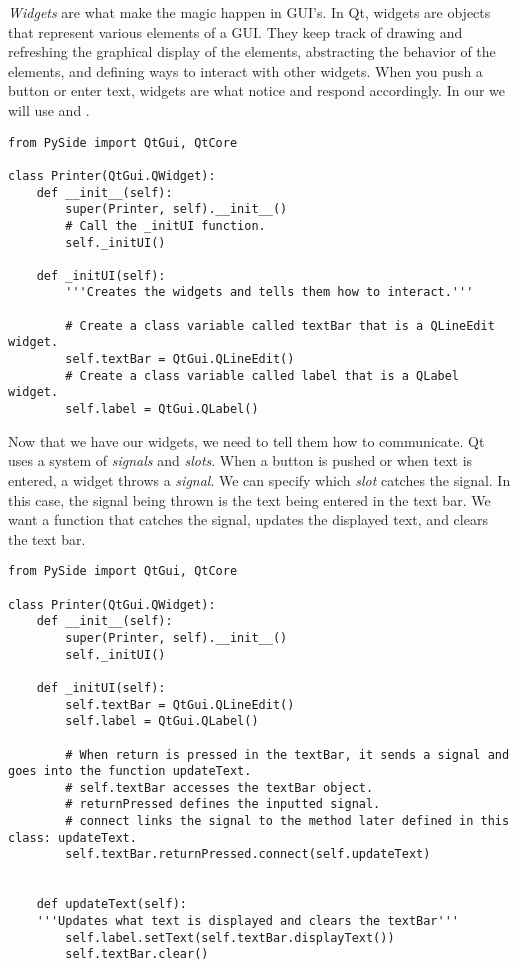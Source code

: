 \emph{Widgets} are what make the magic happen in GUI's.
In Qt, widgets are objects that represent various elements of a GUI.
They keep track of drawing and refreshing the graphical display of the elements, abstracting the behavior of the elements, and defining ways to interact with other widgets.
When you push a button or enter text, widgets are what notice and respond accordingly.
In our  we will use  and .

\begin{lstlisting}
from PySide import QtGui, QtCore

class Printer(QtGui.QWidget):
	def __init__(self):
		super(Printer, self).__init__()
		# Call the _initUI function.
		self._initUI()

	def _initUI(self):
		'''Creates the widgets and tells them how to interact.'''

		# Create a class variable called textBar that is a QLineEdit widget.
		self.textBar = QtGui.QLineEdit()
		# Create a class variable called label that is a QLabel widget.
		self.label = QtGui.QLabel()

\end{lstlisting}

Now that we have our widgets, we need to tell them how to communicate.
Qt uses a system of \emph{signals} and \emph{slots}.
When a button is pushed or when text is entered, a widget throws a \emph{signal}.
We can specify which \emph{slot} catches the signal.
In this case, the signal being thrown is the text being entered in the text bar. We want a function that catches the signal, updates the displayed text, and clears the text bar.

\begin{lstlisting}
from PySide import QtGui, QtCore

class Printer(QtGui.QWidget):
	def __init__(self):
		super(Printer, self).__init__()
		self._initUI()

	def _initUI(self):
		self.textBar = QtGui.QLineEdit()
		self.label = QtGui.QLabel()

		# When return is pressed in the textBar, it sends a signal and goes into the function updateText.
        # self.textBar accesses the textBar object.
        # returnPressed defines the inputted signal.
        # connect links the signal to the method later defined in this class: updateText.
		self.textBar.returnPressed.connect(self.updateText)


	def updateText(self):
	'''Updates what text is displayed and clears the textBar'''
		self.label.setText(self.textBar.displayText())
		self.textBar.clear()

\end{lstlisting}

